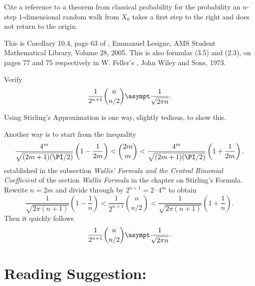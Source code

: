 \documentclass[12pt]{article}
\begin{document}
\begin{exercise}
    Cite a reference to a theorem from classical probability for the
    probability an \( n \)-step \( 1 \)-dimensional random walk from \(
    X_0 \) takes a first step to the right and does not return to the
    origin.
\end{exercise}
\begin{solution}
    This is Corollary 10.4, page 63 of , Emmanuel Lesigne,
    AMS Student Mathematical Library, Volume 28, 2005.  This is also
    formulas (3.5) and (2.3), on pages 77 and 75 respectively in W.
    Feller's , John Wiley and Sons, 1973.
\end{solution}

\begin{exercise}
    Verify
    \[
        \frac{1}{2^{n+1}}\binom{n}{n/2} \asympt \frac{1}{\sqrt{2 \pi n}}.
    \]
\end{exercise}
\begin{solution}
    Using Stirling's Approximation is one way, slightly tedious, to show
    this.

    Another way is to start from the inequality
    \[
        \frac{4^m}{\sqrt{(2m+1)(\PI/2)}}\left(1-\frac{1}{2m} \right) < {\binom
        {2m}{m}} < \frac{4^m}{\sqrt{(2m+1)(\PI/2)}} \left(1 + \frac{1}{2m}
        \right).
    \] established in the subsection \emph{Wallis' Formula and the
    Central Binomial Coefficient} of the section \emph{Wallis Formula}
    in the chapter on Stirling's Formula.  Rewrite \( n = 2m \) and
    divide through by \( 2^{n + 1} = 2 \cdot 4^m \) to obtain
    \[
        \frac{1}{\sqrt{2\pi(n+1)}} \left( 1 - \frac{1}{n} \right) <
        \frac{1}{2^{n+1}} \binom{n}{n/2} < \frac{1}{\sqrt{2\pi(n+1)}}
        \left( 1 + \frac{1}{n} \right).
    \] Then it quickly follows
    \[
        \frac{1}{2^{n+1}}\binom{n}{n/2} \asympt \frac{1}{\sqrt{2 \pi n}}.
    \]
\end{solution}

\hr

\section*{Reading Suggestion:}


\end{document}
